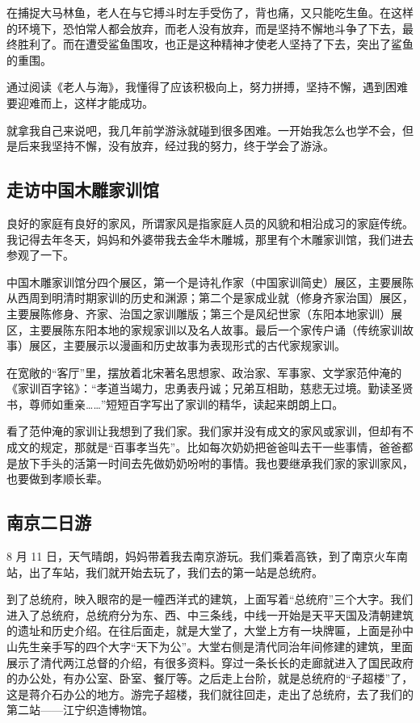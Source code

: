 \documentclass[UTF8,a4paper,titlepage,twoside,10.5pt]{article}
\begin{document}
在捕捉大马林鱼，老人在与它搏斗时左手受伤了，背也痛，又只能吃生鱼。在这样的环境下，恐怕常人都会放弃，而老人没有放弃，而是坚持不懈地斗争了下去，最终胜利了。而在遭受鲨鱼围攻，也正是这种精神才使老人坚持了下去，突出了鲨鱼的重围。

通过阅读《老人与海》，我懂得了应该积极向上，努力拼搏，坚持不懈，遇到困难要迎难而上，这样才能成功。

就拿我自己来说吧，我几年前学游泳就碰到很多困难。一开始我怎么也学不会，但是后来我坚持不懈，没有放弃，经过我的努力，终于学会了游泳。

\subsection{走访中国木雕家训馆}
\label{sec:orgcaa239e}

良好的家庭有良好的家风，所谓家风是指家庭人员的风貌和相沿成习的家庭传统。我记得去年冬天，妈妈和外婆带我去金华木雕城，那里有个木雕家训馆，我们进去参观了一下。

中国木雕家训馆分四个展区，第一个是诗礼作家（中国家训简史）展区，主要展陈从西周到明清时期家训的历史和渊源；第二个是家成业就（修身齐家治国）展区，主要展陈修身、齐家、治国之家训雕版；第三个是风纪世家（东阳本地家训）展区，主要展陈东阳本地的家规家训以及名人故事。最后一个家传户诵（传统家训故事）展区，主要展示以漫画和历史故事为表现形式的古代家规家训。

在宽敞的“客厅”里，摆放着北宋著名思想家、政治家、军事家、文学家范仲淹的《家训百字铭》：“孝道当竭力，忠勇表丹诚；兄弟互相助，慈悲无过境。勤读圣贤书，尊师如重亲……”短短百字写出了家训的精华，读起来朗朗上口。

看了范仲淹的家训让我想到了我们家。我们家并没有成文的家风或家训，但却有不成文的规定，那就是“百事孝当先”。比如每次奶奶把爸爸叫去干一些事情，爸爸都是放下手头的活第一时间去先做奶奶吩咐的事情。我也要继承我们家的家训家风，也要做到孝顺长辈。

\subsection{南京二日游}
\label{sec:org0cfd6ea}

8 月 11 日，天气晴朗，妈妈带着我去南京游玩。我们乘着高铁，到了南京火车南站，出了车站，我们就开始去玩了，我们去的第一站是总统府。

到了总统府，映入眼帘的是一幢西洋式的建筑，上面写着“总统府”三个大字。我们进入了总统府，总统府分为东、西、中三条线，中线一开始是天平天国及清朝建筑的遗址和历史介绍。在往后面走，就是大堂了，大堂上方有一块牌匾，上面是孙中山先生亲手写的四个大字“天下为公”。大堂右侧是清代同治年间修建的建筑，里面展示了清代两江总督的介绍，有很多资料。穿过一条长长的走廊就进入了国民政府的办公处，有办公室、卧室、餐厅等。之后走上台阶，就是总统府的“子超楼”了，这是蒋介石办公的地方。游完子超楼，我们就往回走，走出了总统府，去了我们的第二站——江宁织造博物馆。
\end{document}

